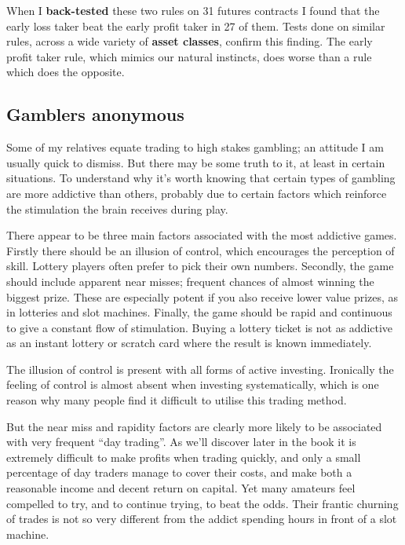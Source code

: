 When I \textbf{back-tested} these two rules on 31 futures contracts I found that the early loss taker beat the early profit taker in 27 of them. Tests done on similar rules, across a wide variety of \textbf{asset classes}, confirm this finding. The early profit taker rule, which mimics our natural instincts, does worse than a rule which does the opposite.

\subsection*{Gamblers anonymous}

Some of my relatives equate trading to high stakes gambling; an attitude I am usually quick to dismiss. But there may be some truth to it, at least in certain situations. To understand why it's worth knowing that certain types of gambling are more addictive than others, probably due to certain factors which reinforce the stimulation the brain receives during play.

There appear to be three main factors associated with the most addictive games. Firstly there should be an illusion of control, which encourages the perception of skill. Lottery players often prefer to pick their own numbers. Secondly, the game should include apparent near misses; frequent chances of almost winning the biggest prize. These are especially potent if you also receive lower value prizes, as in lotteries and slot machines. Finally, the game should be rapid and continuous to give a constant flow of stimulation. Buying a lottery ticket is not as addictive as an instant lottery or scratch card where the result is known immediately.

The illusion of control is present with all forms of active investing. Ironically the feeling of control is almost absent when investing systematically, which is one reason why many people find it difficult to utilise this trading method.

But the near miss and rapidity factors are clearly more likely to be associated with very frequent ``day trading''. As we'll discover later in the book it is extremely difficult to make profits when trading quickly, and only a small percentage of day traders manage to cover their costs, and make both a reasonable income and decent return on capital. Yet many amateurs feel compelled to try, and to continue trying, to beat the odds. Their frantic churning of trades is not so very different from the addict spending hours in front of a slot machine.

